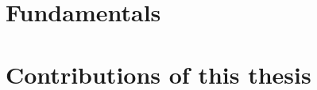 





\dominitoc



\frontmatter
\begingroup

\cleardoublepage

\clearpage

\cleardoublepage



\cleardoublepage


\cleardoublepage

\cleardoublepage


\tableofcontents
\cleardoublepage
{}
\listoffigures 
\cleardoublepage
{}
\listoftables
\cleardoublepage

\cleardoublepage
\endgroup

\mainmatter
{}
\setlength{\parskip}{5pt}

\part{Fundamentals}\label{part1}
%
%
%

\part{Contributions of this thesis}\label{part2}
 
% 
% 

